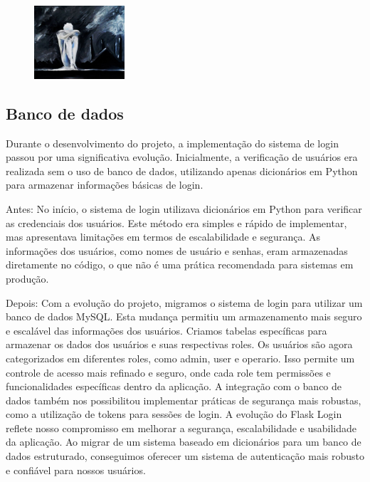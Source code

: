 \documentclass[conference, a4paper, 12pt]{IEEEtran}
\begin{document}
\begin{figure}[h]

  \begin{center}
    \includegraphics[width=0.30\textwidth]{help.jpeg}
  \end{center}
\end{figure}

\subsection{Banco de dados}
Durante o desenvolvimento do projeto, a implementação do sistema de login passou por uma significativa evolução. Inicialmente, a verificação de usuários era realizada sem o uso de banco de dados, utilizando apenas dicionários em Python para armazenar informações básicas de login.

Antes: No início, o sistema de login utilizava dicionários em Python para verificar as credenciais dos usuários. Este método era simples e rápido de implementar, mas apresentava limitações em termos de escalabilidade e segurança.
As informações dos usuários, como nomes de usuário e senhas, eram armazenadas diretamente no código, o que não é uma prática recomendada para sistemas em produção.

Depois: Com a evolução do projeto, migramos o sistema de login para utilizar um banco de dados MySQL. Esta mudança permitiu um armazenamento mais seguro e escalável das informações dos usuários.
Criamos tabelas específicas para armazenar os dados dos usuários e suas respectivas roles. Os usuários são agora categorizados em diferentes roles, como admin, user e operario. Isso permite um controle de acesso mais refinado e seguro, onde cada role tem permissões e funcionalidades específicas dentro da aplicação.
A integração com o banco de dados também nos possibilitou implementar práticas de segurança mais robustas, como a utilização de tokens para sessões de login.
A evolução do Flask Login reflete nosso compromisso em melhorar a segurança, escalabilidade e usabilidade da aplicação. Ao migrar de um sistema baseado em dicionários para um banco de dados estruturado, conseguimos oferecer um sistema de autenticação mais robusto e confiável para nossos usuários.
\end{document}
